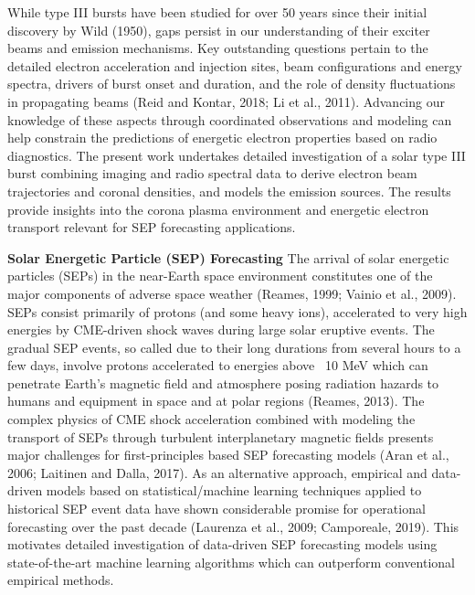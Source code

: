While type III bursts have been studied for over 50 years since their initial discovery by Wild (1950), gaps persist in our understanding of their exciter beams and emission mechanisms. Key outstanding questions pertain to the detailed electron acceleration and injection sites, beam configurations and energy spectra, drivers of burst onset and duration, and the role of density fluctuations in propagating beams (Reid and Kontar, 2018; Li et al., 2011). Advancing our knowledge of these aspects through coordinated observations and modeling can help constrain the predictions of energetic electron properties based on radio diagnostics. The present work undertakes detailed investigation of a solar type III burst combining imaging and radio spectral data to derive electron beam trajectories and coronal densities, and models the emission sources. The results provide insights into the corona plasma environment and energetic electron transport relevant for SEP forecasting applications.

\textbf{Solar Energetic Particle (SEP) Forecasting}
The arrival of solar energetic particles (SEPs) in the near-Earth space environment constitutes one of the major components of adverse space weather (Reames, 1999; Vainio et al., 2009). SEPs consist primarily of protons (and some heavy ions), accelerated to very high energies by CME-driven shock waves during large solar eruptive events. The gradual SEP events, so called due to their long durations from several hours to a few days, involve protons accelerated to energies above ~10 MeV which can penetrate Earth’s magnetic field and atmosphere posing radiation hazards to humans and equipment in space and at polar regions (Reames, 2013). The complex physics of CME shock acceleration combined with modeling the transport of SEPs through turbulent interplanetary magnetic fields presents major challenges for first-principles based SEP forecasting models (Aran et al., 2006; Laitinen and Dalla, 2017). As an alternative approach, empirical and data-driven models based on statistical/machine learning techniques applied to historical SEP event data have shown considerable promise for operational forecasting over the past decade (Laurenza et al., 2009; Camporeale, 2019). This motivates detailed investigation of data-driven SEP forecasting models using state-of-the-art machine learning algorithms which can outperform conventional empirical methods.

